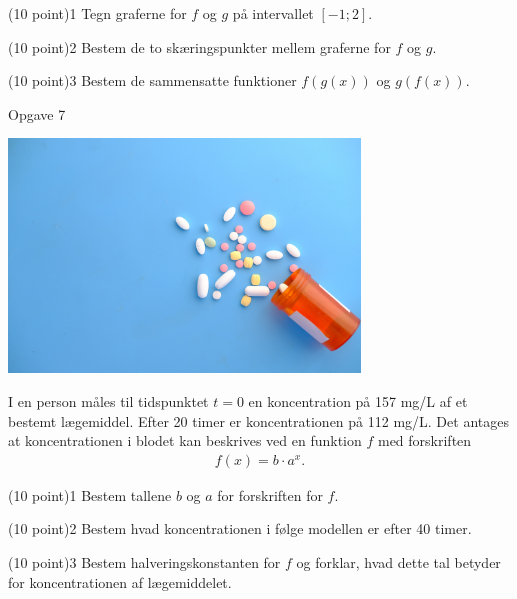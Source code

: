 \documentclass[12pt,x11names,a4paper]{article}
\begin{document}
\begin{delopgave}{\colorbox{NorregGroen!40}{(10 point)}}{1}
Tegn graferne for $f$ og $g$ på intervallet $[-1;2]$. 
\end{delopgave}
\begin{delopgave}{(10 point)}{2}
Bestem de to skæringspunkter mellem graferne for $f$ og $g$. 
\end{delopgave}
\begin{delopgave}{(10 point)}{3}
Bestem de sammensatte funktioner $f(g(x))$ og $g(f(x))$. 
\end{delopgave}

\begin{opgavetekst}{Opgave 7}
\begin{center}
\includegraphics[width = 0.7\textwidth]{Billeder/Medicin}
\end{center}
I en person måles til tidspunktet $t = 0$ en koncentration på 157 mg/L af et bestemt lægemiddel. Efter 20 timer er koncentrationen på 112 mg/L. Det antages at koncentrationen i blodet kan beskrives ved en funktion $f$ med forskriften
\begin{align*}
f(x) = b \cdot a^x.
\end{align*}
\end{opgavetekst}

\begin{delopgave}{\colorbox{NorregGroen!40}{(10 point)}}{1}
Bestem tallene $b$ og $a$ for forskriften for $f$.
\end{delopgave}
\begin{delopgave}{\colorbox{NorregGroen!40}{(10 point)}}{2}
Bestem hvad koncentrationen i følge modellen er efter 40 timer. 
\end{delopgave}
\begin{delopgave}{(10 point)}{3}
Bestem halveringskonstanten for $f$ og forklar, hvad dette tal betyder for koncentrationen af lægemiddelet. 
\end{delopgave}
\end{document}
